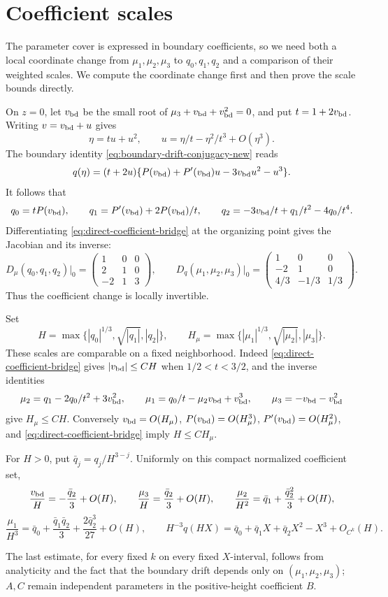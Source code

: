 \section{Coefficient scales}
\label{app:coordinates}

The parameter cover is expressed in boundary coefficients, so we need
both a local coordinate change from \(\mu_1,\mu_2,\mu_3\) to
\(q_0,q_1,q_2\) and a comparison of their weighted scales. We compute
the coordinate change first and then prove the scale bounds directly.

On \(z=0\), let \(v_{\rm bd}\) be the small root of
\(\mu_3+v_{\rm bd}+v_{\rm bd}^2=0\), and put
\(t=1+2v_{\rm bd}\). Writing \(v=v_{\rm bd}+u\) gives
\[
 \eta=tu+u^2,\qquad
 u=\eta/t-\eta^2/t^3+O(\eta^3).
\]
The boundary identity
\eqref{eq:boundary-drift-conjugacy-new} reads
\[
 q(\eta)=(t+2u)\{P(v_{\rm bd})+P'(v_{\rm bd})u-3v_{\rm bd}u^2-u^3\}.
\]
It follows that
\begin{equation}
\label{eq:direct-coefficient-bridge}
 q_0=tP(v_{\rm bd}),\qquad q_1=P'(v_{\rm bd})+2P(v_{\rm bd})/t,\qquad
 q_2=-3v_{\rm bd}/t+q_1/t^2-4q_0/t^4.
\end{equation}
Differentiating \eqref{eq:direct-coefficient-bridge} at the organizing
point gives the Jacobian and its inverse:
\[
 D_{\mu}(q_0,q_1,q_2)\big|_0
 =\begin{pmatrix}1&0&0\\[1mm]2&1&0\\[1mm]-2&1&3\end{pmatrix},
 \qquad
 D_q(\mu_1,\mu_2,\mu_3)\big|_0
 =\begin{pmatrix}1&0&0\\[1mm]-2&1&0\\[1mm]4/3&-1/3&1/3\end{pmatrix}.
\]
Thus the coefficient change is locally invertible.

Set
\[
 H=\max\{|q_0|^{1/3},\sqrt{|q_1|},|q_2|\},\qquad
 H_\mu=\max\{|\mu_1|^{1/3},\sqrt{|\mu_2|},|\mu_3|\}.
\]
These scales are comparable on a fixed neighborhood.
Indeed \eqref{eq:direct-coefficient-bridge} gives \(|v_{\rm bd}|\le CH\)
when \(1/2<t<3/2\), and the inverse identities
\[
 \mu_2=q_1-2q_0/t^2+3v_{\rm bd}^2,\qquad
 \mu_1=q_0/t-\mu_2v_{\rm bd}+v_{\rm bd}^3,\qquad
 \mu_3=-v_{\rm bd}-v_{\rm bd}^2
\]
give \(H_\mu\le CH\). Conversely \(v_{\rm bd}=O(H_\mu)\),
\(P(v_{\rm bd})=O(H_\mu^3)\), \(P'(v_{\rm bd})=O(H_\mu^2)\), and
\eqref{eq:direct-coefficient-bridge} imply \(H\le CH_\mu\).

\begin{samepage}
For \(H>0\), put \(\bar q_j=q_j/H^{3-j}\). Uniformly on this
compact normalized coefficient set,
\[
 \frac {v_{\rm bd}}H=-\frac{\bar q_2}{3}+O(H),\qquad
 \frac{\mu_3}{H}=\frac{\bar q_2}{3}+O(H),\qquad
 \frac{\mu_2}{H^2}=\bar q_1+\frac{\bar q_2^2}{3}+O(H),
\]
\[
 \frac{\mu_1}{H^3}
   =\bar q_0+\frac{\bar q_1\bar q_2}{3}+\frac{2\bar q_2^3}{27}+O(H),\qquad
 H^{-3}q(HX)=\bar q_0+\bar q_1X+\bar q_2X^2-X^3+O_{C^k}(H).
\]
\end{samepage}
The last estimate, for every fixed \(k\) on every fixed \(X\)-interval,
follows from analyticity and the fact that the boundary drift depends only on
\((\mu_1,\mu_2,\mu_3)\); \(A,C\) remain independent parameters
in the positive-height coefficient \(B\).
